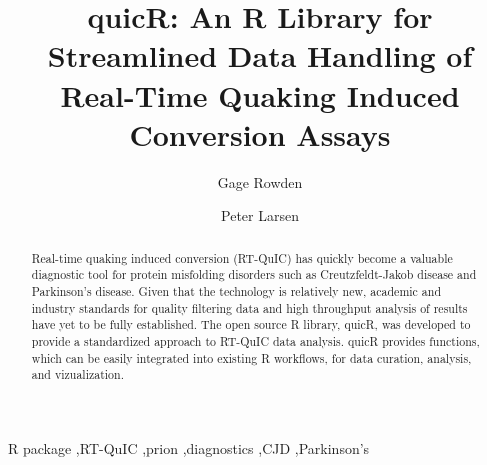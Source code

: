 \documentclass[preprint,12pt, a4paper]{elsarticle}
\begin{document}
\renewcommand{\labelenumii}{\arabic{enumi}.\arabic{enumii}}

\begin{frontmatter}

 


\title{quicR: An R Library for Streamlined Data Handling of Real-Time Quaking Induced Conversion Assays}

\author[label1,label2,label3]{Gage Rowden}
\fntext[email]{}
\cortext[cor]{}
\author[label1,label2,label3]{Peter Larsen}
\address[label1]{Department of Veterinary and Biomedical Sciences, University of Minnesota, St. Paul, MN 55108, USA.}
\address[label2]{Minnesota Center for Prion Research and Outreach, University of Minnesota, St. Paul, MN 55108, USA.}
\address[label3]{Priogen Corp., St. Paul, MN 55114, USA.}

\begin{abstract}
Real-time quaking induced conversion (RT-QuIC) has quickly become a valuable diagnostic tool for protein misfolding disorders such as Creutzfeldt-Jakob disease and Parkinson's disease. Given that the technology is relatively new, academic and industry standards for quality filtering data and high throughput analysis of results have yet to be fully established. The open source R library, quicR, was developed to provide a standardized approach to RT-QuIC data analysis. quicR provides functions, which can be easily integrated into existing R workflows, for data curation, analysis, and vizualization.
\end{abstract}

\begin{keyword}
R package \sep RT-QuIC \sep prion \sep diagnostics \sep CJD \sep Parkinson's



\end{keyword}

\end{frontmatter}
\end{document}
